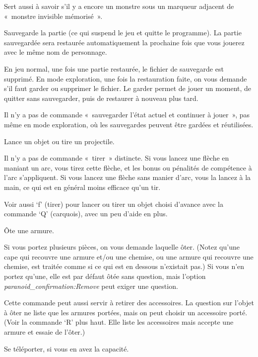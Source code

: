 \documentclass[titlepage]{article}
\begin{document}
\begin{description}
Sert aussi à savoir s'il y a encore un monstre sous un marqueur adjacent de
«~monstre invisible mémorisé~».

\item[{S}]
Sauvegarde la partie (ce qui suspend le jeu et quitte le programme).
La partie sauvegardée sera restaurée automatiquement la prochaine fois que
vous jouerez avec le même nom de personnage.


En jeu normal, une fois une partie restaurée, le fichier de sauvegarde est
supprimé.
En mode exploration, une fois la restauration faite, on vous demande s'il
faut garder ou supprimer le fichier.
Le garder permet de jouer un moment, de quitter sans sauvegarder, puis de
restaurer à nouveau plus tard.


Il n'y a pas de commande «~sauvegarder l'état actuel et continuer à
jouer~», pas même en mode exploration, où les sauvegardes peuvent être
gardées et réutilisées.

\item[{t}]
Lance un objet ou tire un projectile.


Il n'y a pas de commande «~tirer~» distincte.
Si vous lancez une flèche en maniant un arc, vous tirez cette flèche, et
les bonus ou pénalités de compétence à l'arc s'appliquent.
Si vous lancez une flèche sans manier d'arc, vous la lancez à la main, ce
qui est en général moins efficace qu'un tir.


Voir aussi `f' (tirer) pour lancer ou tirer un objet choisi d'avance
avec la commande `Q' (carquois), avec un peu d'aide en plus.

\item[{T}]
Ôte une armure.


Si vous portez plusieurs pièces, on vous demande laquelle ôter.
(Notez qu'une cape qui recouvre une armure et/ou une chemise, ou une
armure qui recouvre une chemise, est traitée comme si ce qui est en
dessous n'existait pas.)
Si vous n'en portez qu'une, elle est par défaut ôtée sans question, mais
l'option
\textit{paranoid\_confirmation:Remove}
peut exiger une question.


Cette commande peut aussi servir à retirer des accessoires.
La question sur l'objet à ôter ne liste que les armures portées, mais on
peut choisir un accessoire porté.
(Voir la commande `R' plus haut.
Elle liste les accessoires mais accepte une armure et essaie de l'ôter.)

\item[{\textasciicircum{}T}]
Se téléporter, si vous en avez la capacité.


\end{description}
\end{document}
